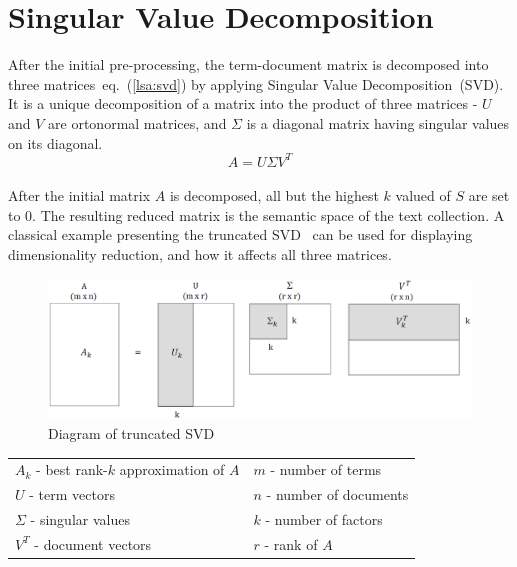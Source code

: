 \section{Singular Value Decomposition}
\label{sec:lsa:svd}

After the initial pre-processing, the term-document matrix is decomposed into three matrices~eq.~(\ref{lsa:svd}) by applying Singular Value Decomposition~(\gls{SVD}). It is a unique decomposition of a matrix into the product of three matrices - $U$ and $V$ are ortonormal matrices, and $ \Sigma $ is a diagonal matrix having singular values on its diagonal.\\
%
%
\begin{equation}
\label{lsa:svd}
A=U \Sigma V^{T}
\end{equation}\\

After the initial matrix $A$ is decomposed, all but the highest $k$ valued of $S$ are set to $0$. The resulting reduced matrix is the semantic space of the text collection. A classical example presenting the truncated \gls{SVD}~\cite{Dumais88usingLSA}  can be used for displaying dimensionality reduction, and how it affects all three matrices.\\
%
%
\begin{center}
\begin{figure}[htbp]
\label{lsa:truncated_svd}
	\centering
	\includegraphics[width=\ScaleIfNeeded]{img/svd} 
	\caption[Diagram of truncated SVD]%
           {Diagram of truncated SVD}
\end{figure}
%
%
\begin{tabular}{l l}
$A_{k}$ - best rank-$k$ approximation of $A$ & $m$ - number of terms\\
$U$ - term vectors & $n$ - number of documents \\
$\Sigma$ - singular values & $k$ - number of factors \\
$V^{T}$ - document vectors & $r$ - rank of $A$ \\
\end{tabular}
\end{center} 

